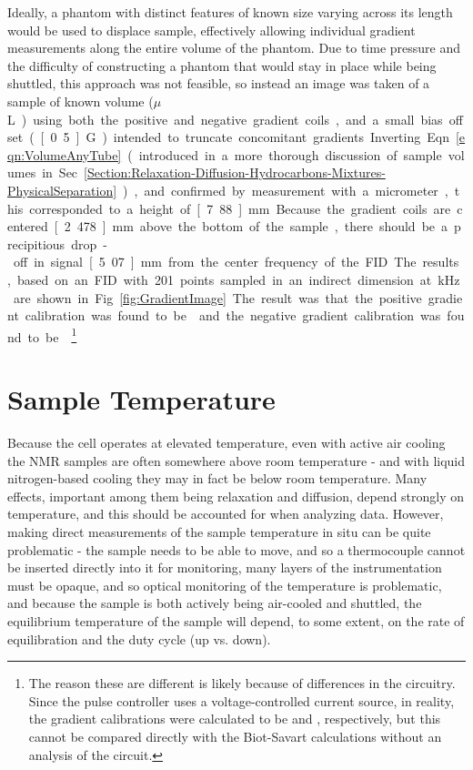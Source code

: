 \documentclass[PaulGanssle-Thesis.tex]{subfiles}
\begin{document}
Ideally, a phantom with distinct features of known size varying across its length would be used to displace sample, effectively allowing individual gradient measurements along the entire volume of the phantom. Due to time pressure and the difficulty of constructing a phantom that would stay in place while being shuttled, this approach was not feasible, so instead an image was taken of a sample of known volume (\unit[100]{$\mu$L}) using both the positive and negative gradient coils, and a small bias offset (\unit[0.5]{G}) intended to truncate concomitant gradients. Inverting Eqn. \ref{eqn:VolumeAnyTube} (introduced in a more thorough discussion of sample volumes in Sec. \ref{Section:Relaxation-Diffusion-Hydrocarbons-Mixtures-PhysicalSeparation}), and confirmed by measurement with a micrometer, this corresponded to a height of \unit[7.88]{mm}. Because the gradient coils are centered \unit[2.478]{mm} above the bottom of the sample, there should be a precipitious drop-off in signal \unit[5.07]{mm} from the center frequency of the FID. The results, based on an FID with 201 points sampled in an indirect dimension at \unit[20]{kHz} are shown in Fig. \ref{fig:GradientImage}. The result was that the positive gradient calibration was found to be  and the negative gradient calibration was found to be \footnote{The reason these are different is likely because of differences in the circuitry. Since the pulse controller uses a voltage-controlled current source, in reality, the gradient calibrations were calculated to be  and , respectively, but this cannot be compared directly with the Biot-Savart calculations without an analysis of the circuit.}

\section{Sample Temperature}
\label{nmr.sampletemp}
Because the cell  operates at elevated temperature, even with active air cooling the NMR samples are often somewhere above room temperature - and with liquid nitrogen-based cooling they may in fact be below room temperature. Many effects, important among them being relaxation and diffusion, depend strongly on temperature, and this should be accounted for when analyzing data. However, making direct measurements of the sample temperature in situ can be quite problematic - the sample needs to be able to move, and so a thermocouple cannot be inserted directly into it for monitoring, many layers of the instrumentation must be opaque, and so optical monitoring of the temperature is problematic, and because the sample is both actively being air-cooled and shuttled, the equilibrium temperature of the sample will depend, to some extent, on the rate of equilibration and the duty cycle (up vs. down). 
\end{document}
